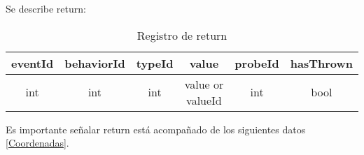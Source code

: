 \documentclass[10pt,a4paper]{article}
\begin{document}
Se describe return:\\

\begin{table}[!h]
\begin{center}
\begin{tabular}{| c | c | c | c | c | c |}
\hline
eventId & behaviorId & typeId & value & probeId & hasThrown \\
\hline
int & int & int & value or valueId\footnotemark[1] & int & bool\\
\hline
\end{tabular}
\caption{Registro de return} 
\end{center}
\end{table}

Es importante señalar return está acompañado de los siguientes datos \ref{Coordenadas}.

\end{document}
